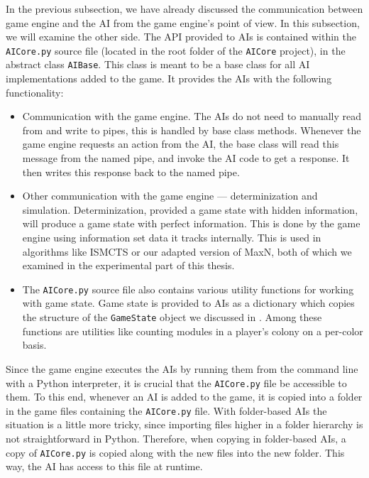 In the previous subsection, we have already discussed the communication between
game engine and the AI from the game engine's point of view. In this subsection,
we will examine the other side. The API provided to AIs is contained
within the \texttt{AICore.py} source file (located in the root folder of the
\texttt{AICore} project), in the abstract class \texttt{AIBase}.
This class is meant to be a base class for all AI implementations
added to the game. It provides the AIs with the following functionality:
\begin{itemize}
    \item Communication with the game engine. The AIs do not need to
        manually read from and write to pipes, this is handled by base
        class methods. Whenever the game engine requests an action from the
        AI, the base class will read this message from the named pipe, and invoke
        the AI code to get a response. It then writes this response back to the
        named pipe.
    \item Other communication with the game engine --- determinization
        and simulation. Determinization, provided a game state with hidden
        information, will produce a game state with perfect information. This
        is done by the game engine using information set data it tracks
        internally. This is used in algorithms like ISMCTS or our adapted
        version of MaxN, both of which we examined in the experimental
        part of this thesis.
    \item The \texttt{AICore.py} source file also contains various
        utility functions for working with game state.
        Game state is provided to AIs as a dictionary which
        copies the structure of the \texttt{GameState}
        object we discussed in .
        Among these functions are utilities like counting
        modules in a player's colony on a per-color basis.
\end{itemize}

Since the game engine executes the AIs by running them from the command line
with a Python interpreter, it is crucial that the \texttt{AICore.py}
file be accessible to them. To this end, whenever an AI is added to the game,
it is copied into a folder in the game files containing the \texttt{AICore.py}
file. With folder-based AIs the situation is a little more tricky, since
importing files higher in a folder hierarchy is not straightforward in Python.
Therefore, when copying in folder-based AIs, a copy of \texttt{AICore.py}
is copied along with the new files into the new folder. This way, the AI
has access to this file at runtime.

